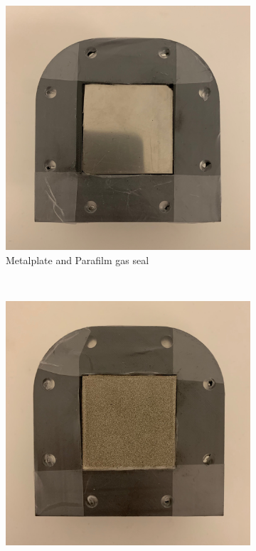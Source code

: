 \begin{figure}[ht]
    \centering
    \begin{subfigure}[b]{0.3\textwidth}
        \includegraphics[width=\textwidth]{DIV./Bilder/Assembly/Ass1.jpg}
        \caption{Metalplate and Parafilm gas seal}
        \label{fig:GasSealMetal}
    \end{subfigure}
    ~ %
    \begin{subfigure}[b]{0.3\textwidth}
        \includegraphics[width=\textwidth]{DIV./Bilder/Assembly/Ass2.jpg}

\end{subfigure}
\end{figure}

